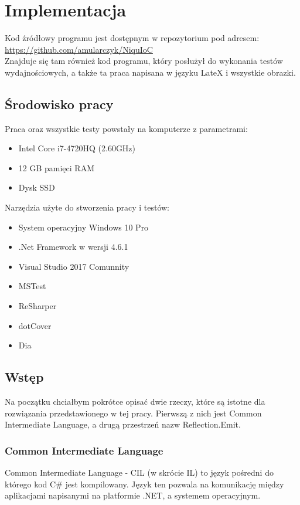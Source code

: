 \documentclass[12pt]{article}
\begin{document}
\clearpage
\section{Implementacja}
Kod źródłowy programu jest dostępnym w repozytorium pod adresem:\\
\url{https://github.com/amularczyk/NiquIoC}\\
Znajduje się tam również kod programu, który posłużył do wykonania testów wydajnościowych, a także ta praca napisana w języku LateX i wszystkie obrazki.

\subsection{Środowisko pracy}
Praca oraz wszystkie testy powstały na komputerze z parametrami:
\begin{itemize}
	\item Intel Core i7-4720HQ (2.60GHz)
	\item 12 GB pamięci RAM
	\item Dysk SSD
\end{itemize}
Narzędzia użyte do stworzenia pracy i testów:
\begin{itemize}
	\item System operacyjny Windows 10 Pro
	\item .Net Framework w wersji 4.6.1
	\item Visual Studio 2017 Comunnity
	\item MSTest
	\item ReSharper
	\item dotCover
	\item Dia
\end{itemize}


\subsection{Wstęp}
Na początku chciałbym pokrótce opisać dwie rzeczy, które są istotne dla rozwiązania przedstawionego w tej pracy. Pierwszą z nich jest Common Intermediate Language, a drugą przestrzeń nazw Reflection.Emit.

\subsubsection{Common Intermediate Language}
Common Intermediate Language - CIL (w skrócie IL) to język pośredni do którego kod C\# jest kompilowany. Język ten pozwala na komunikację między aplikacjami napisanymi na platformie .NET, a systemem operacyjnym.
\end{document}

